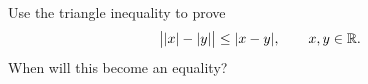 \begin{exercise}
  \label{ex:hw03:reverse-triangle-inequality}
  Use the triangle inequality to prove
  \[
    \bigl||x|-|y|\bigr|\leq|x-y|,\qquad x,y\in\mathbb{R}.
  \]
  When will this become an equality?
\end{exercise}
